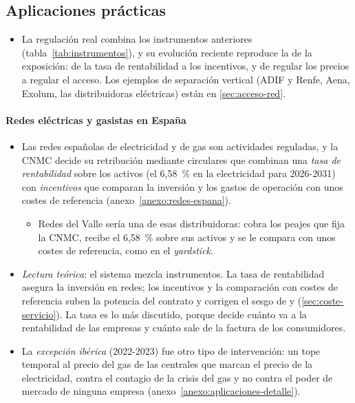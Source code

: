 \documentclass[11pt]{article}
\begin{document}
\subsection{Aplicaciones prácticas}\label{sec:aplicaciones}

\begin{itemize}
\item La regulación real combina los instrumentos anteriores (tabla~\ref{tab:instrumentos}), y su evolución reciente reproduce la de la exposición: de la tasa de rentabilidad a los incentivos, y de regular los precios a regular el acceso. Los ejemplos de separación vertical (ADIF y Renfe, Aena, Exolum, las distribuidoras eléctricas) están en \ref{sec:acceso-red}.
\end{itemize}


\paragraph{Redes eléctricas y gasistas en España}

\begin{itemize}
\item Las redes españolas de electricidad y de gas son actividades reguladas, y la CNMC decide su retribución mediante circulares que combinan una \emph{tasa de rentabilidad} sobre los activos (el 6,58~\% en la electricidad para 2026-2031)\nocite{CNMC2025Circular9} con \emph{incentivos} que comparan la inversión y los gastos de operación con unos costes de referencia\nocite{CNMC2025Circular8} (anexo~\ref{anexo:redes-espana}).
  \begin{itemize}
  \item Redes del Valle sería una de esas distribuidoras: cobra los peajes que fija la CNMC, recibe el 6,58~\% sobre sus activos y se le compara con unos costes de referencia, como en el \emph{yardstick}.
  \end{itemize}
\item \emph{Lectura teórica}: el sistema mezcla instrumentos. La tasa de rentabilidad asegura la inversión en redes; los incentivos y la comparación con costes de referencia suben la potencia del contrato y corrigen el sesgo de  y  (\ref{sec:coste-servicio}). La tasa es lo más discutido, porque decide cuánto va a la rentabilidad de las empresas y cuánto sale de la factura de los consumidores.
\item La \emph{excepción ibérica} (2022-2023) fue otro tipo de intervención: un tope temporal al precio del gas de las centrales que marcan el precio de la electricidad, contra el contagio de la crisis del gas y no contra el poder de mercado de ninguna empresa\nocite{BOE2022RDL10,BOE2023RDL3} (anexo~\ref{anexo:aplicaciones-detalle}).
\end{itemize}
\end{document}
